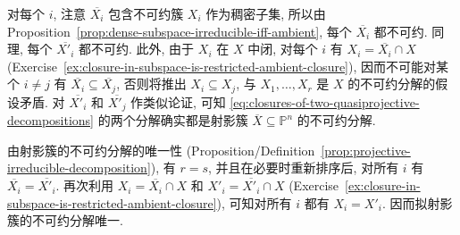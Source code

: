 \begin{Proof}
对每个 $i$, 注意 $\overline{X_{i}}$ 包含不可约簇 $X_{i}$ 作为稠密子集, 所以由 Proposition~\ref{prop:dense-subspace-irreducible-iff-ambient}, 每个 $\overline{X_{i}}$ 都不可约. 同理, 每个 $\overline{X'_{i}}$ 都不可约. 此外, 由于 $X_{i}$ 在 $X$ 中闭, 对每个 $i$ 有 $X_{i}=\overline{X_{i}}\cap X$ (Exercise~\ref{ex:closure-in-subspace-is-restricted-ambient-closure}), 因而不可能对某个 $i\ne j$ 有 $\overline{X_{i}}\subseteq\overline{X_{j}}$, 否则将推出 $X_{i}\subseteq X_{j}$, 与 $X_{1},\ldots,X_{r}$ 是 $X$ 的不可约分解的假设矛盾. 对 $\overline{X'_{i}}$ 和 $\overline{X'_{j}}$ 作类似论证, 可知 \eqref{eq:closures-of-two-quasiprojective-decompositions} 的两个分解确实都是射影簇 $\overline{X}\subseteq\mathbb{P}^{n}$ 的不可约分解.

由射影簇的不可约分解的唯一性 (Proposition/Definition~\ref{prop:projective-irreducible-decomposition}), 有 $r=s$, 并且在必要时重新排序后, 对所有 $i$ 有 $\overline{X_{i}}=\overline{X'_{i}}$. 再次利用 $X_{i}=\overline{X_{i}}\cap X$ 和 $X'_{i}=\overline{X'_{i}}\cap X$ (Exercise~\ref{ex:closure-in-subspace-is-restricted-ambient-closure}), 可知对所有 $i$ 都有 $X_{i}=X'_{i}$. 因而拟射影簇的不可约分解唯一.
\end{Proof}

